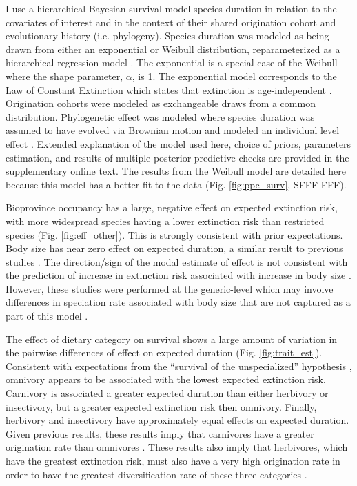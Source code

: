 \documentclass[12pt]{article}
\begin{document}
I use a hierarchical Bayesian survival model species duration in relation to the covariates of interest and in the context of their shared origination cohort and evolutionary history (i.e. phylogeny). Species duration was modeled as being drawn from either an exponential or Weibull distribution, reparameterized as a hierarchical regression model \cite{Gelman2013d}. The exponential is a special case of the Weibull where the shape parameter, $\alpha$, is 1. The exponential model corresponds to the Law of Constant Extinction which states that extinction is age-independent \cite{VanValen1973}. Origination cohorts were modeled as exchangeable draws from a common distribution. Phylogenetic effect was modeled where species duration was assumed to have evolved via Brownian motion and modeled an individual level effect \cite{Housworth2004}. Extended explanation of the model used here, choice of priors, parameters estimation, and results of multiple posterior predictive checks are provided in the supplementary online text. The results from the Weibull model are detailed here because this model has a better fit to the data (Fig. \ref{fig:ppc_surv}, SFFF-FFF).

Bioprovince occupancy has a large, negative effect on expected extinction risk, with more widespread species having a lower extinction risk than restricted species (Fig. \ref{fig:eff_other}). This is strongly consistent with prior expectations. Body size has near zero effect on expected duration, a similar result to previous studies \cite{Tomiya2013}. The direction/sign of the modal estimate of effect is not consistent with the prediction of increase in extinction risk associated with increase in body size \cite{Liow2008}. However, these studies were performed at the generic-level which may involve differences in speciation rate associated with body size that are not captured as a part of this model \cite{Tomiya2013,Liow2008}.

The effect of dietary category on survival shows a large amount of variation in the pairwise differences of effect on expected duration (Fig. \ref{fig:trait_est}). Consistent with expectations from the ``survival of the unspecialized'' hypothesis \cite{Liow2004a,Simpson1944}, omnivory appears to be associated with the lowest expected extinction risk. Carnivory is associated a greater expected duration than either herbivory or insectivory, but a greater expected extinction risk then omnivory. Finally, herbivory and insectivory have approximately equal effects on expected duration. Given previous results, these results imply that carnivores have a greater origination rate than omnivores \cite{Price2012}. These results also imply that herbivores, which have the greatest extinction risk, must also have a very high origination rate in order to have the greatest diversification rate of these three categories \cite{Price2012}. 
\end{document}
